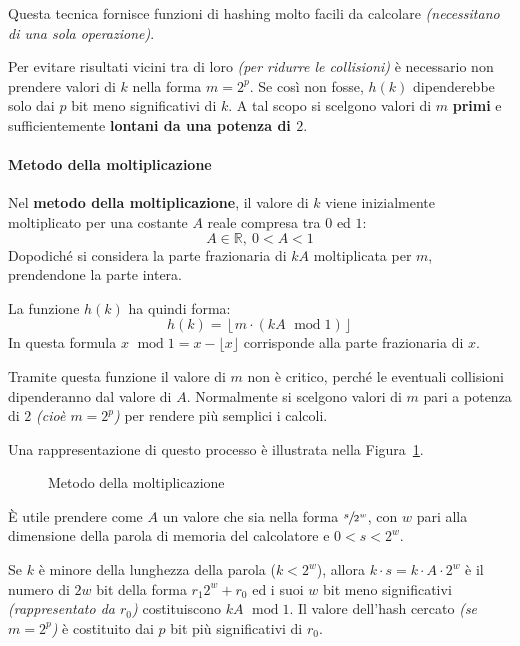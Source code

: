 \documentclass[italian, 10pt]{article}
\DeclareMathOperator{\modop}{\ mod}
\begin{document}
\bigskip
Questa tecnica fornisce funzioni di hashing molto facili da calcolare \textit{(necessitano di una sola operazione)}.

Per evitare risultati vicini tra di loro \textit{(per ridurre le collisioni)} è necessario non prendere valori di \(k\) nella forma \(m = 2^p\).
Se così non fosse, \(h(k)\) dipenderebbe solo dai \(p\) bit meno significativi di \(k\).
A tal scopo si scelgono valori di \(m\) \textbf{primi} e sufficientemente \textbf{lontani da una potenza di \(2\)}.

\paragraph{Metodo della moltiplicazione}

Nel \textbf{metodo della moltiplicazione}, il valore di \(k\) viene inizialmente moltiplicato per una costante \(A\) reale compresa tra \(0\) ed \(1\):
\[ A \in \mathbb{R},\ 0 < A < 1 \]
Dopodiché si considera la parte frazionaria di \(kA\) moltiplicata per \(m\), prendendone la parte intera.

La funzione \(h(k)\) ha quindi forma:
\[h(k) = \left\lfloor m \cdot (kA \modop 1) \right\rfloor \]
In questa formula \(x \modop 1 = x - \lfloor x \rfloor\) corrisponde alla parte frazionaria di \(x\).

Tramite questa funzione il valore di \(m\) non è critico, perché le eventuali collisioni dipenderanno dal valore di \(A\).
Normalmente si scelgono valori di \(m\) pari a potenza di \(2\) \textit{(cioè \(m = 2^p\))} per rendere più semplici i calcoli.

Una rappresentazione di questo processo è illustrata nella Figura~\ref{fig:metodo-della-moltiplicazione}.

\begin{figure}[htbp]
  \bigskip
  \centering
  \caption{Metodo della moltiplicazione}
  \label{fig:metodo-della-moltiplicazione}
  \bigskip
\end{figure}
\bigskip
È utile prendere come \(A\) un valore che sia nella forma \(\sfrac{s}{2^w}\), con \(w\) pari alla dimensione della parola di memoria del calcolatore e \(0 < s < 2^w\).

Se \(k\) è minore della lunghezza della parola (\(k < 2^w\)), allora \(k \cdot s = k \cdot A \cdot 2^w\) è il numero di \(2w\) bit della forma \(r_1 2^w + r_0\) ed i suoi \(w\) bit meno significativi \textit{(rappresentato da \(r_0\))} costituiscono \(kA \modop 1\).
Il valore dell'hash cercato \textit{(se \(m = 2^p\))} è costituito dai \(p\) bit più significativi di \(r_0\).
\end{document}
